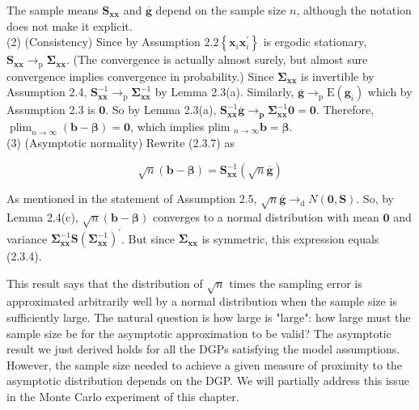 \documentclass[10pt]{article}
\begin{document}
The sample means $\mathbf{S}_{\mathbf{x x}}$ and $\overline{\mathbf{g}}$ depend on the sample size $n$, although the notation does not make it explicit.\\
(2) (Consistency) Since by Assumption $2.2\left\{\mathbf{x}_{i} \mathbf{x}_{i}^{\prime}\right\}$ is ergodic stationary, $\mathbf{S}_{\mathbf{x x}} \rightarrow_{\mathrm{p}} \boldsymbol{\Sigma}_{\mathbf{x} \mathbf{x}}$. (The convergence is actually almost surely, but almost sure convergence implies convergence in probability.) Since $\mathbf{\Sigma}_{\mathbf{x x}}$ is invertible by Assumption 2.4, $\mathbf{S}_{\mathbf{x x}}^{-1} \rightarrow_{\mathrm{p}} \boldsymbol{\Sigma}_{\mathbf{x x}}^{-1}$ by Lemma 2.3(a). Similarly, $\overline{\mathbf{g}} \rightarrow_{\mathrm{p}} \mathrm{E}\left(\mathbf{g}_{i}\right)$ which by Assumption 2.3 is $\mathbf{0}$. So by Lemma 2.3(a), $\mathbf{S}_{\mathbf{x x}}^{-1} \overline{\mathbf{g}} \rightarrow_{\mathbf{p}} \boldsymbol{\Sigma}_{\mathbf{x x}}^{-1} \mathbf{0}=\mathbf{0}$. Therefore, $\operatorname{plim}_{n \rightarrow \infty}(\mathbf{b}- \boldsymbol{\beta})=\mathbf{0}$, which implies plim $_{n \rightarrow \infty} \mathbf{b}=\boldsymbol{\beta}$.\\
(3) (Asymptotic normality) Rewrite (2.3.7) as


\begin{equation*}
\sqrt{n}(\mathbf{b}-\boldsymbol{\beta})=\mathbf{S}_{\mathbf{x x}}^{-1}(\sqrt{n} \overline{\mathbf{g}}) \tag{2.3.8}
\end{equation*}


As mentioned in the statement of Assumption 2.5, $\sqrt{n} \overline{\mathbf{g}} \rightarrow_{\mathrm{d}} N(\mathbf{0}, \mathbf{S})$. So, by Lemma 2.4(c), $\sqrt{n}(\mathbf{b}-\boldsymbol{\beta})$ converges to a normal distribution with mean $\mathbf{0}$ and variance $\boldsymbol{\Sigma}_{\mathbf{x x}}^{-1} \mathbf{S}\left(\boldsymbol{\Sigma}_{\mathbf{x x}}^{-1}\right)^{\prime}$. But since $\boldsymbol{\Sigma}_{\mathbf{x x}}$ is symmetric, this expression equals (2.3.4).

This result says that the distribution of $\sqrt{n}$ times the sampling error is approximated arbitrarily well by a normal distribution when the sample size is sufficiently large. The natural question is how large is "large": how large must the sample size be for the asymptotic approximation to be valid? The asymptotic result we just derived holds for all the DGPs satisfying the model assumptions. However, the sample size needed to achieve a given measure of proximity to the asymptotic distribution depends on the DGP. We will partially address this issue in the Monte Carlo experiment of this chapter.
\end{document}
